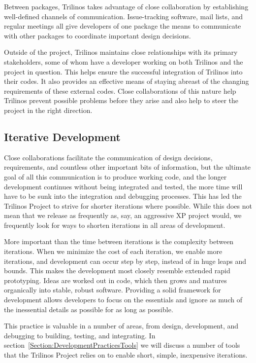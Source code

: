 \documentclass[12pt,relax]{article}
\begin{document}
Between packages, Trilinos takes advantage of close collaboration by 
establishing well-defined channels of communication.  Issue-tracking
software, mail lists, and regular meetings all give developers of one package
the means to communicate with other packages to coordinate important design
decisions.

Outside of the project, Trilinos maintains close relationships with its primary
stakeholders, some of whom have a developer working on both Trilinos and the
project in question.  This helps ensure the successful integration of Trilinos
into their codes.  It also provides an effective means of staying abreast of
the changing requirements of these external codes.  Close collaborations of
this nature help Trilinos prevent possible problems before they arise and also
help to steer the project in the right direction.

\subsection{Iterative Development}

Close collaborations facilitate the communication of design decisions, 
requirements, and countless other important bits of information, but the
ultimate goal of all this communication is to produce working code, and the
longer development continues without being integrated and tested, the more
time will have to be sunk into the integration and debugging processes.  This
has led the Trilinos Project to strive for shorter iterations where possible.
While this does not mean that we release as frequently as, say, an aggressive XP
project would, we frequently look for ways to shorten iterations in all
areas of development.

More important than the time between iterations is the complexity between
iterations.  When we minimize the cost of each iteration, we enable more
iterations, and development can occur step by step, instead of in huge leaps
and bounds.  This makes the development most closely resemble extended
rapid prototyping.  Ideas are worked out in code, which then grows and matures
organically into stable, robust software.  Providing a solid framework for
development allows developers to focus on the essentials and ignore as much of
the inessential details as possible for as long as possible.

This practice is valuable in a number of areas, from design,
development, and debugging to building, testing, and integrating.  In 
section~\ref{Section:DevelopmentPracticesTools}
we will discuss a number of tools that the Trilinos Project relies on to enable
short, simple, inexpensive iterations.
\end{document}
